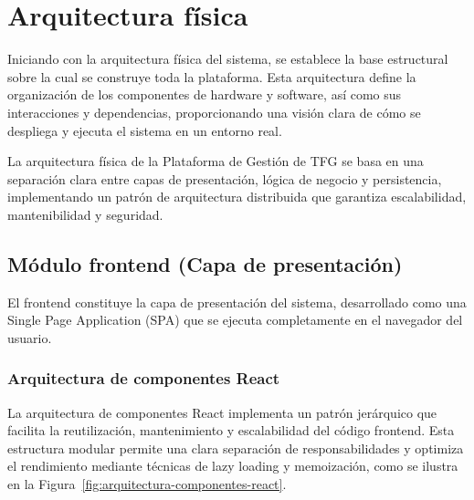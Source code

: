 \documentclass[12pt,a4paper,oneside]{report}
\begin{document}
\section{Arquitectura física}\label{arquitectura-fuxedsica}

Iniciando con la arquitectura física del sistema, se establece la base
estructural sobre la cual se construye toda la plataforma. Esta
arquitectura define la organización de los componentes de hardware y
software, así como sus interacciones y dependencias, proporcionando una
visión clara de cómo se despliega y ejecuta el sistema en un entorno
real.

La arquitectura física de la Plataforma de Gestión de TFG se basa en una
separación clara entre capas de presentación, lógica de negocio y
persistencia, implementando un patrón de arquitectura distribuida que
garantiza escalabilidad, mantenibilidad y seguridad.

\subsection{Módulo frontend (Capa de
presentación)}\label{muxf3dulo-frontend-capa-de-presentaciuxf3n}

El frontend constituye la capa de presentación del sistema, desarrollado
como una Single Page Application (SPA) que se ejecuta completamente en
el navegador del usuario.

\subsubsection{Arquitectura de componentes
React}\label{arquitectura-de-componentes-react}

La arquitectura de componentes React implementa un patrón jerárquico que facilita la reutilización, mantenimiento y escalabilidad del código frontend. Esta estructura modular permite una clara separación de responsabilidades y optimiza el rendimiento mediante técnicas de lazy loading y memoización, como se ilustra en la Figura~\ref{fig:arquitectura-componentes-react}.
\end{document}
